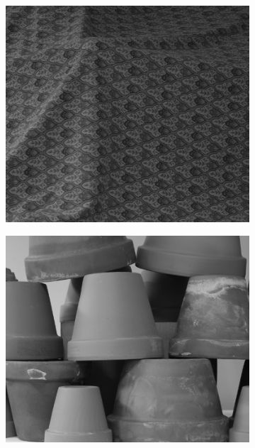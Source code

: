 \begin{figure}[h]
\centering
    \begin{subfigure}[t]{0.32\textwidth}
        \centering
        \includegraphics[width=\textwidth]{images/cloth_left}
    \end{subfigure}
    \hfill
    \begin{subfigure}[t]{0.32\textwidth}
        \centering
        \includegraphics[width=\textwidth]{images/pots_left}
    \end{subfigure}

\end{figure}
